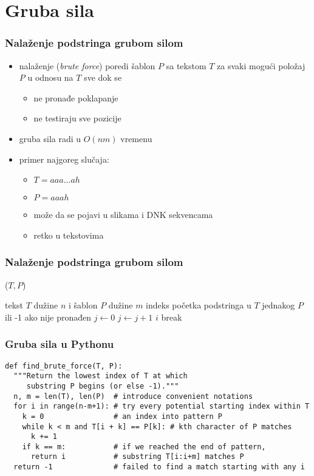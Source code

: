 \documentclass[compress,aspectratio=169]{beamer}
\begin{document}
\section[GS]{Gruba sila}

\begin{frame}[fragile]
  \frametitle{Nalaženje podstringa grubom silom}
  \begin{itemize}
    \item nalaženje  (\textit{brute force}) poredi šablon
    $P$ sa tekstom $T$ za svaki mogući položaj $P$ u odnosu na $T$ sve dok se
    \begin{itemize}
      \item ne pronađe poklapanje
      \item ne testiraju sve pozicije
    \end{itemize}
    \item gruba sila radi u $O(nm)$ vremenu
    \item primer najgoreg slučaja:
    \begin{itemize}
      \item $T = aaa \ldots ah$
      \item $P = aaah$
      \item može da se pojavi u slikama i DNK sekvencama
      \item retko u tekstovima
    \end{itemize}
  \end{itemize}
\end{frame}

\begin{frame}
  \frametitle{Nalaženje podstringa grubom silom}
  ($T, P$)
  \begin{algorithmic}
    \REQUIRE tekst $T$ dužine $n$ i šablon $P$ dužine $m$
    \ENSURE indeks početka podstringa u $T$ jednakog $P$ ili -1 ako nije pronađen
      \STATE $j \leftarrow 0$  
        \STATE $j \leftarrow j+1$
          \RETURN $i$ 
        \ELSE
          \STATE break
        \ENDIF
      \ENDWHILE
    \ENDFOR
     
  \end{algorithmic}    
\end{frame}

\begin{frame}[fragile,shrink=18]
  \frametitle{Gruba sila u Pythonu}
\begin{verbatim}
def find_brute_force(T, P):
  """Return the lowest index of T at which
     substring P begins (or else -1)."""
  n, m = len(T), len(P)  # introduce convenient notations
  for i in range(n-m+1): # try every potential starting index within T
    k = 0                # an index into pattern P
    while k < m and T[i + k] == P[k]: # kth character of P matches
      k += 1
    if k == m:           # if we reached the end of pattern,
      return i           # substring T[i:i+m] matches P
  return -1              # failed to find a match starting with any i
\end{verbatim}
\end{frame}
\end{document}

